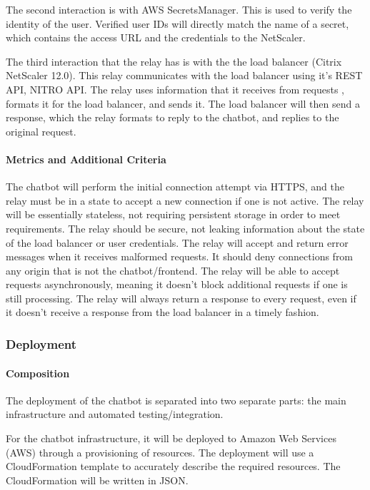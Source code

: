 The second interaction is with AWS SecretsManager.
This is used to verify the identity of the user.
Verified user IDs will directly match the name of a secret, which contains the access URL and the credentials to the NetScaler.

The third interaction that the relay has is with the the load balancer (Citrix NetScaler 12.0).
This relay communicates with the load balancer using it's REST API, NITRO API.
The relay uses information that it receives from requests , formats it for the load balancer, and sends it.
The load balancer will then send a response, which the relay formats to reply to the chatbot, and replies to the original request.

\paragraph{Metrics and Additional Criteria}
The chatbot will perform the initial connection attempt via HTTPS, and the relay must be in a state to accept a new connection if one is not active.
The relay will be essentially stateless, not requiring persistent storage in order to meet requirements.
The relay should be secure, not leaking information about the state of the load balancer or user credentials.
The relay will accept and return error messages when it receives malformed requests.
It should deny connections from any origin that is not the chatbot/frontend.
The relay will be able to accept requests asynchronously, meaning it doesn't block additional requests if one is still processing.
The relay will always return a response to every request, even if it doesn't receive a response from the load balancer in a timely fashion.

\subsubsection{Deployment}
\paragraph{Composition}
The deployment of the chatbot is separated into two separate parts: the main infrastructure and automated testing/integration. 

For the chatbot infrastructure, it will be deployed to Amazon Web Services (AWS) through a provisioning of resources.
The deployment will use a CloudFormation\cite{cloudformation} template to accurately describe the required resources.
The CloudFormation will be written in JSON.

